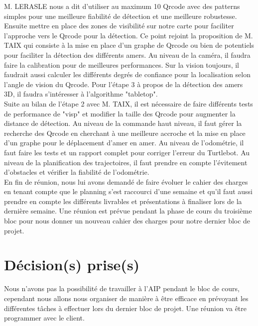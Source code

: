 \documentclass[a4wide,10pt]{article}
\begin{document}
M. LERASLE nous a dit d'utiliser au maximum 10 Qrcode avec des patterns simples pour une meilleure fiabilité de détection et une meilleure robustesse.  Ensuite mettre en place des zones de visibilité sur notre carte pour faciliter l'approche vers le Qrcode pour la détection. Ce point rejoint la proposition de M. TAIX qui consiste à la mise en place d'un graphe de Qrcode ou bien de potentiels pour faciliter la détection des différents amers. Au niveau de la caméra, il faudra faire la calibration pour de meilleures performances. Sur la vision toujours, il faudrait aussi calculer les différents degrés de confiance pour la localisation selon l'angle de vision du Qrcode. Pour l'étape 3 à propos de la détection des amers 3D, il faudra s'intéresser à l'algorithme "tabletop".\\

Suite au bilan de l'étape 2 avec M. TAIX, il est nécessaire de faire différents tests de performance de "visp" et modifier la taille des Qrcode pour augmenter la distance de détection. Au niveau de la commande haut niveau, il faut gérer la recherche des Qrcode en cherchant à une meilleure accroche et la mise en place d'un graphe pour le déplacement d'amer en amer. Au niveau de l'odométrie, il faut faire les tests et un rapport complet pour corriger l'erreur du Turtlebot. Au niveau de la planification des trajectoires, il faut prendre en compte l'évitement d'obstacles et vérifier la fiabilité de l'odométrie.\\

En fin de réunion, nous lui avons demandé de faire évoluer le cahier des charges en tenant compte que le planning s'est raccourci d'une semaine et qu'il faut aussi prendre en compte les différents livrables et présentations à finaliser lors de la dernière semaine. Une réunion est prévue pendant la phase de cours du troisième bloc pour nous donner un nouveau cahier des charges pour notre dernier bloc de projet.

\section*{Décision(s) prise(s)}

Nous n'avons pas la possibilité de travailler à l'AIP pendant le bloc de cours, cependant nous allons nous organiser de manière à être efficace en prévoyant les différentes tâches à effectuer lors du dernier bloc de projet. Une réunion va être programmer avec le client.

\subsection*{\color{red}{Prochaine réunion : dans 3 semaines environ pendant le bloc 3 de cours}}
\end{document}
